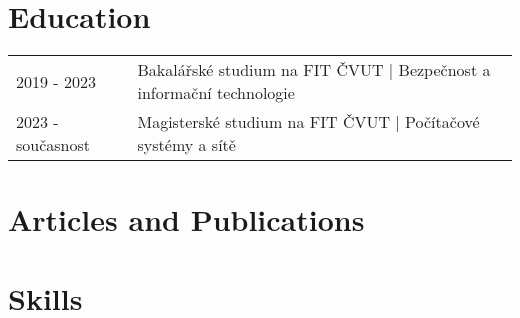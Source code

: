\documentclass[a4paper,12pt]{article}
\begin{document}
\section{Education}
\begin{tabularx}{\linewidth}{@{}l X@{}}	
2019 - 2023 & Bakalářské studium na FIT ČVUT | Bezpečnost a informační technologie \\
2023 - současnost & Magisterské studium na FIT ČVUT | Počítačové systémy a sítě
\end{tabularx}

\section{Articles and Publications}
\begin{refsection}
\nocite{*}
\printbibliography[heading=none]
\end{refsection}


\section{Skills}
\end{document}
